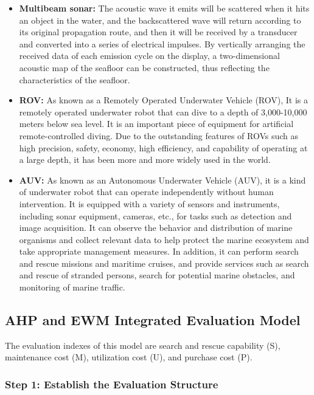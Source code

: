 \documentclass[12pt]{article}
\begin{document}
\begin{itemize}
    \item \textbf{Multibeam sonar:} The acoustic wave it emits will be scattered when it hits an object in the water, and the backscattered wave will return according to its original propagation route, and then it will be received by a transducer and converted into a series of electrical impulses. By vertically arranging the received data of each emission cycle on the display, a two-dimensional acoustic map of the seafloor can be constructed, thus reflecting the characteristics of the seafloor. \cite{10.3390/rs13010035}
    \item \textbf{ROV:} As known as a Remotely Operated Underwater Vehicle (ROV), It is a remotely operated underwater robot that can dive to a depth of 3,000-10,000 meters below sea level. It is an important piece of equipment for artificial remote-controlled diving. Due to the outstanding features of ROVs such as high precision, safety, economy, high efficiency, and capability of operating at a large depth, it has been more and more widely used in the world.
    \item \textbf{AUV:} As known as an Autonomous Underwater Vehicle (AUV), it is a kind of underwater robot that can operate independently without human intervention. It is equipped with a variety of sensors and instruments, including sonar equipment, cameras, etc., for tasks such as detection and image acquisition. It can observe the behavior and distribution of marine organisms and collect relevant data to help protect the marine ecosystem and take appropriate management measures. In addition, it can perform search and rescue missions and maritime cruises, and provide services such as search and rescue of stranded persons, search for potential marine obstacles, and monitoring of marine traffic. \cite{10.1109/joe.2013.2278891}
\end{itemize}

\subsection{AHP and EWM Integrated Evaluation Model}

The evaluation indexes of this model are search and rescue capability (S), maintenance cost (M), utilization cost (U), and purchase cost (P).

\subsubsection*{Step 1: Establish the Evaluation Structure}
\end{document}
